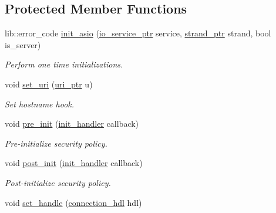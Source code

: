 \subsection*{Protected Member Functions}
\begin{DoxyCompactItemize}
\item 
lib\+::error\+\_\+code \hyperlink{classwebsocketpp_1_1transport_1_1asio_1_1tls__socket_1_1connection_a1417198fda5e1fd0043ddfcea23eeae1}{init\+\_\+asio} (\hyperlink{classwebsocketpp_1_1transport_1_1asio_1_1tls__socket_1_1connection_af821cbbeb6df7cdea6348c7d64b00b7a}{io\+\_\+service\+\_\+ptr} service, \hyperlink{classwebsocketpp_1_1transport_1_1asio_1_1tls__socket_1_1connection_aea9f37f95a42ad1a82a4ff0d7977ae37}{strand\+\_\+ptr} strand, bool is\+\_\+server)
\begin{DoxyCompactList}\small\item\em Perform one time initializations. \end{DoxyCompactList}\item 
void \hyperlink{classwebsocketpp_1_1transport_1_1asio_1_1tls__socket_1_1connection_a8cb70301d7d244a72ed1ca90872253ed}{set\+\_\+uri} (\hyperlink{namespacewebsocketpp_aae370ea5ac83a8ece7712cb39fc23f5b}{uri\+\_\+ptr} u)
\begin{DoxyCompactList}\small\item\em Set hostname hook. \end{DoxyCompactList}\item 
void \hyperlink{classwebsocketpp_1_1transport_1_1asio_1_1tls__socket_1_1connection_a1e9487282a1c81169ba3818c640fa578}{pre\+\_\+init} (\hyperlink{namespacewebsocketpp_1_1transport_aeae75e675c1a334b3b33ab7120b480a5}{init\+\_\+handler} callback)
\begin{DoxyCompactList}\small\item\em Pre-\/initialize security policy. \end{DoxyCompactList}\item 
void \hyperlink{classwebsocketpp_1_1transport_1_1asio_1_1tls__socket_1_1connection_aac77e88754c55f2cd67a90adf47fc2f0}{post\+\_\+init} (\hyperlink{namespacewebsocketpp_1_1transport_aeae75e675c1a334b3b33ab7120b480a5}{init\+\_\+handler} callback)
\begin{DoxyCompactList}\small\item\em Post-\/initialize security policy. \end{DoxyCompactList}\item 
void \hyperlink{classwebsocketpp_1_1transport_1_1asio_1_1tls__socket_1_1connection_a24ad10248362f74dc3cce74c79ee5d82}{set\+\_\+handle} (\hyperlink{namespacewebsocketpp_a6b3d26a10ee7229b84b776786332631d}{connection\+\_\+hdl} hdl)

\end{DoxyCompactItemize}

